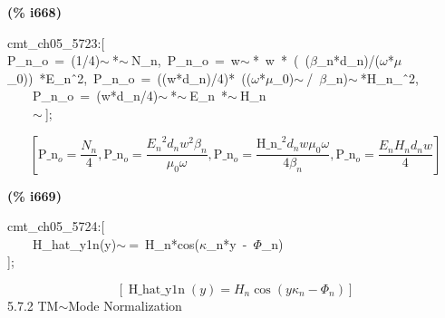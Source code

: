 \documentclass[fleqn]{article}
\begin{document}
\noindent
\begin{minipage}[t]{4.000000em}\color{red}\bfseries
(\% i668)	
\end{minipage}
\begin{minipage}[t]{\textwidth}\color{blue}
cmt\_ch05\_5723:[\\
P\_n\_o\ =\ (1/4)\ensuremath{\sim\ }*\ensuremath{\sim\ }N\_n,\ P\_n\_o\ =\ w\ensuremath{\sim\ }*\ w\ *\ (\ (\ensuremath{\beta}\_n*d\_n)/(\ensuremath{\omega}*\ensuremath{\mu}\_0))\ *E\_n\^\ 2,\ P\_n\_o\ =\ ((w*d\_n)/4)*\ ((\ensuremath{\omega}*\ensuremath{\mu}\_0)\ensuremath{\sim\ }/\ \ensuremath{\beta}\_n)\ensuremath{\sim\ }*H\_n\_\^\ 2,\\
\ \ \ \ P\_n\_o\ =\ (w*d\_n/4)\ensuremath{\sim\ }*\ensuremath{\sim\ }E\_n\ *\ensuremath{\sim\ }H\_n\\
\ \ \ \ \ensuremath{\sim\ }];
\end{minipage}
\[\displaystyle \tag{\% o668} 
\operatorname{[}{{\ensuremath{\mathrm{P\_ n}}}_o}=\frac{{N_n}}{4}\operatorname{,}{{\ensuremath{\mathrm{P\_ n}}}_o}=\frac{{{{E_n}}^{2}} {d_n} {{w}^{2}} {{\beta }_n}}{{{\mu }_0} \omega }\operatorname{,}{{\ensuremath{\mathrm{P\_ n}}}_o}=\frac{{{\ensuremath{\mathrm{H\_ n\_ }}}^{2}} {d_n} w {{\mu }_0} \omega }{4 {{\beta }_n}}\operatorname{,}{{\ensuremath{\mathrm{P\_ n}}}_o}=\frac{{E_n} {H_n} {d_n} w}{4}\operatorname{]}\mbox{}
\]


\noindent
\begin{minipage}[t]{4.000000em}\color{red}\bfseries
(\% i669)	
\end{minipage}
\begin{minipage}[t]{\textwidth}\color{blue}
cmt\_ch05\_5724:[\\
\ \ \ \ H\_hat\_y1n(y)\ensuremath{\sim\ }=\ H\_n*cos(\ensuremath{\kappa}\_n*y\ -\ \ensuremath{\Phi}\_n)\\
];
\end{minipage}
\[\displaystyle \tag{\% o669} 
\left[ \operatorname{H\_ hat\_ y1n}(y)={H_n} \cos{\left( y {{\kappa }_n}-{{\Phi }_n}\right) }\right] \mbox{}
\]
5.7.2   TM\ensuremath{\sim }Mode Normalization
\end{document}
